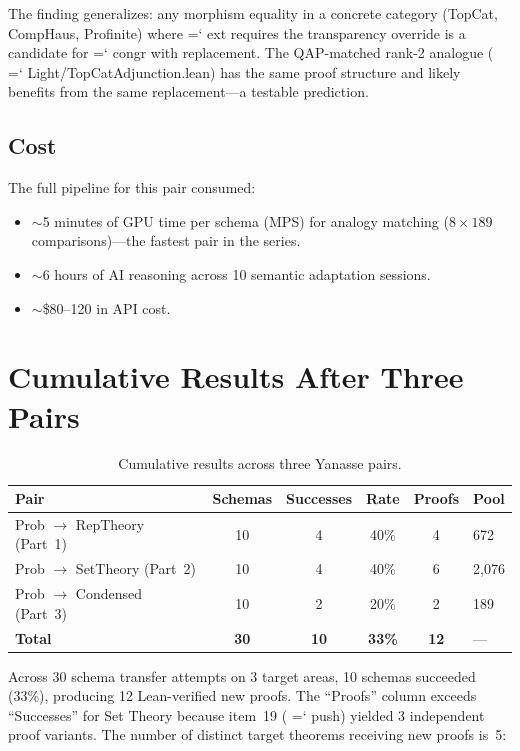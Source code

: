 \documentclass[11pt]{article}
\renewcommand{\texttt}[1]{%
  \begingroup\ttfamily\hyphenchar\font=`\-\relax
  \def\_{\textunderscore\discretionary{}{}{}}%
  #1\endgroup}
\theoremstyle{definition}
\theoremstyle{remark}
\begin{document}
The finding generalizes: any morphism equality in a concrete
category (TopCat, CompHaus, Profinite) where \texttt{ext} requires
the transparency override is a candidate for \texttt{congr with}
replacement.  The QAP-matched rank-2 analogue
(\texttt{Light/TopCatAdjunction.lean}) has the same proof
structure and likely benefits from the same replacement---a
testable prediction.

\subsection{Cost}

The full pipeline for this pair consumed:
\begin{itemize}
\item ${\sim}$5 minutes of GPU time per schema (MPS) for analogy
  matching ($8 \times 189$ comparisons)---the fastest pair in
  the series.
\item ${\sim}$6 hours of AI reasoning across 10 semantic adaptation
  sessions.
\item ${\sim}$\$80--120 in API cost.
\end{itemize}

\section{Cumulative Results After Three Pairs}\label{sec:cumulative}

\begin{table}[h]
\centering\small
\caption{Cumulative results across three Yanasse pairs.}
\label{tab:cumulative}
\begin{tabular}{@{}lccccl@{}}
\toprule
Pair & Schemas & Successes & Rate & Proofs & Pool \\
\midrule
Prob $\to$ RepTheory (Part~1)
  & 10 & 4 & 40\% & 4 & 672 \\
Prob $\to$ SetTheory (Part~2)
  & 10 & 4 & 40\% & 6 & 2{,}076 \\
Prob $\to$ Condensed (Part~3)
  & 10 & 2 & 20\% & 2 & 189 \\
\midrule
\textbf{Total} & \textbf{30} & \textbf{10} & \textbf{33\%}
  & \textbf{12} & --- \\
\bottomrule
\end{tabular}
\end{table}

Across 30 schema transfer attempts on 3 target areas, 10 schemas
succeeded (33\%), producing 12 Lean-verified new proofs.  The
``Proofs'' column exceeds ``Successes'' for Set Theory because
item~19 (\texttt{push}) yielded 3 independent proof variants.
The number of distinct target theorems receiving new proofs is~5:
\end{document}
